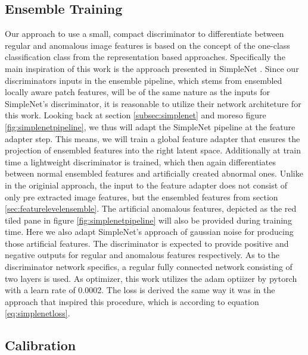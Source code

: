 \subsection{Ensemble Training}
\label{sec:discriminator}
Our approach to use a small, compact discriminator to differentiate between regular and anomalous image features is based on the concept of 
the one-class classification class from the representation based approaches. Specifically the main inspiration of this work is the approach 
presented in SimpleNet \cite{liu2023simplenet}. Since our discriminators inputs in the ensemble pipeline, which stems from ensembled locally aware patch features, 
will be of the same nature as 
the inputs for SimpleNet's discriminator, it is reasonable to utilize their network architeture for this work. Looking back at section 
\ref{subsec:simplenet} and moreso figure \ref{fig:simplenetpipeline}, we thus will adapt the SimpleNet pipeline at the feature adapter step. 
This means, we will train a global feature adapter that ensures the projection of ensembled features into the right latent space. Additionally at train time a lightweight discriminator 
is trained, which then again differentiates between normal ensembled features and artificially created abnormal ones. Unlike in the originial approach, the input to the feature adapter 
does not consist of only pre extracted image features, 
but the ensembled features from section \ref{sec:featurelevelensemble}. The artificial anomalous features, 
depicted as the red tiled pane in figure \ref{fig:simplenetpipeline} will also be provided during training time. Here we also adapt SimpleNet's approach of 
gaussian noise for producing those artificial features. %
The discriminator is expected to provide positive and negative outputs for regular and anomalous features respectively.
As to the discriminator network specifics, a regular fully connected network consisting of two layers is used. As optimizer, this work utilizes the 
adam optiizer by pytorch with a learn rate of 0.0002. The loss is derived the same way it was in the approach that inspired this procedure, 
which is according to equation \ref{eq:simplenetloss}.


\subsection{Calibration}
\label{sec:Calibration}

